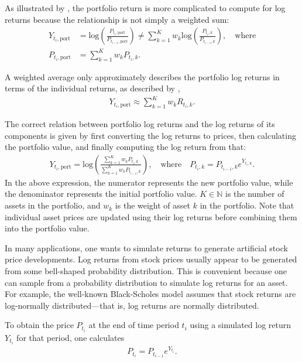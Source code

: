 As illustrated by \citet[p.~4]{Danielsson2011}, the portfolio return is more complicated to compute for log returns because the relationship is not simply a weighted sum:
\begin{align*}
        Y_{t_i,\mathrm{port}} &= \mathrm{log}\left(\frac{P_{t_i,\mathrm{port}}}{P_{t_{i-1},\mathrm{port}}}\right) \neq  \sum_{k=1}^K w_k \mathrm{log}\left(\frac{P_{t_i,k}}{P_{t_{i-1},k}}\right), \quad \text{where} \\
        P_{t_i,\mathrm{port}} &= \sum_{k=1}^K w_k P_{t_i,k}.
\end{align*}

A weighted average only approximately describes the portfolio log returns in terms of the individual returns, as described by \citet[p.~3]{Danielsson2011},
\begin{align*}
    Y_{t_i,\mathrm{port}} \approx \sum_{k=1}^K w_k R_{t_i,k}.
\end{align*}

The correct relation between portfolio log returns and the log returns of its components is given by first converting the log returns to prices, then calculating the portfolio value, and finally computing the log return from that:
\begin{align*}
    Y_{t_i,\mathrm{port}} = \mathrm{log} \left( \frac{\sum_{k=1}^K w_k P_{t_i,k}}{\sum_{k=1}^K w_k P_{t_{i-1},k}} \right), \quad \text{where} \quad P_{t_i,k} = P_{t_{i-1},k} e^{Y_{t_i,k}}.
\end{align*}
In the above expression, the numerator represents the new portfolio value, while the denominator represents the initial portfolio value. $K \in \mathbb{N}$ is the number of assets in the portfolio, and $w_k$ is the weight of asset $k$ in the portfolio. Note that individual asset prices are updated using their log returns before combining them into the portfolio value. 

In many applications, one wants to simulate returns to generate artificial stock price developments. Log returns from stock prices usually appear to be generated from some bell-shaped probability distribution. This is convenient because one can sample from a probability distribution to simulate log returns for an asset. For example, the well-known Black-Scholes model assumes that stock returns are log-normally distributed—that is, log returns are normally distributed. 

To obtain the price $P_{t_i}$ at the end of time period $t_i$ using a simulated log return $Y_{t_i}$ for that period, one calculates 
\begin{align*}
    P_{t_i} = P_{t_{i-1}} e^{Y_{t_i}}.
\end{align*}

